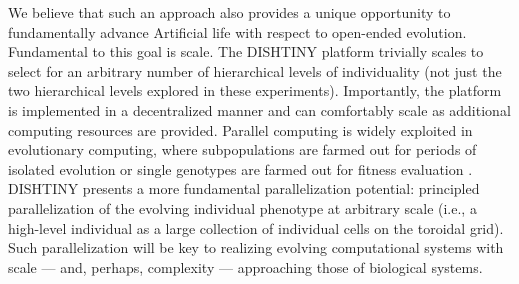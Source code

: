 We believe that such an approach also provides a unique opportunity to fundamentally advance Artificial life with respect to open-ended evolution.
Fundamental to this goal is scale.
The DISHTINY platform trivially scales to select for an arbitrary number of hierarchical levels of individuality (not just the two hierarchical levels explored in these experiments).
Importantly, the platform is implemented in a decentralized manner and can comfortably scale as additional computing resources are provided.
Parallel computing is widely exploited in evolutionary computing, where subpopulations are farmed out for periods of isolated evolution or single genotypes are farmed out for fitness evaluation
\citep{lin1994coarse, real17a}.
DISHTINY presents a more fundamental parallelization potential: principled parallelization of the evolving individual phenotype at arbitrary scale (i.e., a high-level individual as a large collection of individual cells on the toroidal grid).
Such parallelization will be key to realizing evolving computational systems with scale --- and, perhaps, complexity --- approaching those of biological systems.
